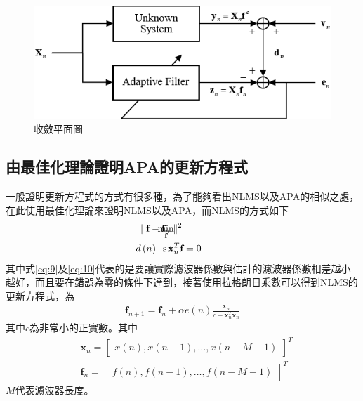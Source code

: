 \documentclass[conference]{IEEEtran}
\begin{document}
    \begin{figure}[t]
        \centering
        \includegraphics[width={1\linewidth}]{Figure/fig4.png}
        \caption{收斂平面圖}
        \label{fig:3}
        \vspace{-0.25cm}
    \end{figure}
    \subsection{由最佳化理論證明APA的更新方程式}
    一般證明更新方程式的方式有很多種，為了能夠看出NLMS以及APA的相似之處，在此使用最佳化理論\cite{Haykin2014adaptive}來證明NLMS以及APA，而NLMS的方式如下
    \begin{align}
        & \hspace{-0.25cm} \min_{\textbf{f}} 
        & & \hspace{-1.8cm} \parallel \textbf{f}-\textbf{f}_n \parallel^2 \label{eq:9} \\ 
        & \text{s.t.} & & \hspace{-1.8cm} d \left( n \right)-\textbf{x}^T_n\textbf{f}=0 \label{eq:10}
    \end{align}
    其中式\eqref{eq:9}及\eqref{eq:10}代表的是要讓實際濾波器係數與估計的濾波器係數相差越小越好，而且要在錯誤為零的條件下達到，接著使用拉格朗日乘數可以得到NLMS的更新方程式，為
    \begin{align}\label{eq:11}
        \textbf{f}_{n+1}=\textbf{f}_{n}+\alpha e\left( n \right)\frac{\textbf{x}_n}{c+\textbf{x}^T_n\textbf{x}_n}
    \end{align}
    其中$c$為非常小的正實數。其中
    \begin{align}
        &\textbf{x}_n=
        \begin{bmatrix}
            x\left( n \right), x\left( n-1 \right), \ldots, x\left( n-M+1 \right)
        \end{bmatrix}^T\label{eq:12}\\
        &\textbf{f}_n=
        \begin{bmatrix}
            f\left( n \right), f\left( n-1 \right), \ldots, f\left( n-M+1 \right)
        \end{bmatrix}^T\label{eq:13}
    \end{align}
    $M$代表濾波器長度。
    
\end{document}
